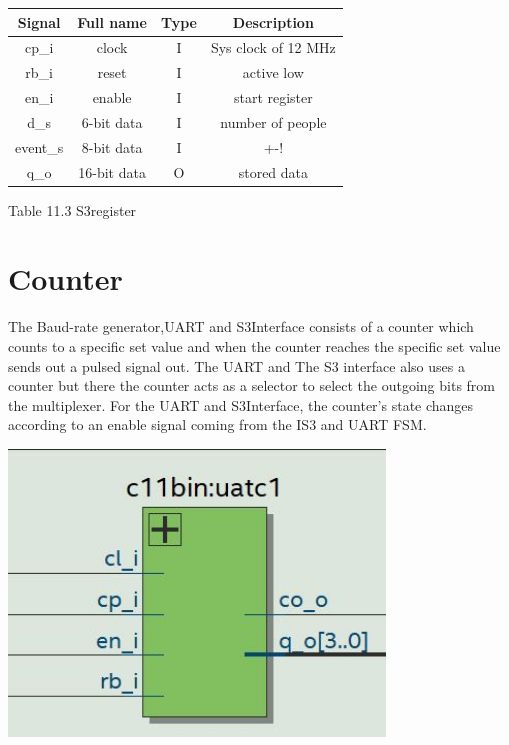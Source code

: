 \documentclass{article}
\begin{document}
\vspace{1 cm}
\begin{center}
           \begin{tabular}{|c|c|c|c|}
        \hline 
        Signal  &  Full name & Type & Description \\
        \hline
        \hline
        cp\_i & clock & I & Sys clock of 12 MHz \\
        \hline
        rb\_i & reset &  I &active low \\
        \hline
        en\_i & enable & I &start register  \\
        \hline
        d\_s & 6-bit data & I &number of people   \\ 
        \hline
        event\_s &  8-bit data  & I & +-! \\
        \hline 
        q\_o &   16-bit data & O & stored data\\
        \hline 
          \end{tabular}
\end{center}
Table 11.3 S3register

\newpage

 \section{Counter}
  
 The Baud-rate generator,UART and S3Interface consists of a counter which counts to a specific set value and when the counter reaches the specific set value sends out a pulsed signal out. The UART and The S3 interface also uses a counter but there the counter acts as a selector to select the outgoing bits from the multiplexer. For the UART and S3Interface, the counter's state changes according to an enable signal coming from the IS3 and UART FSM. 

\vspace{1.5cm}
\begin{center}

\includegraphics[width=10cm]{count.JPG}
\end{center}
\end{document}
